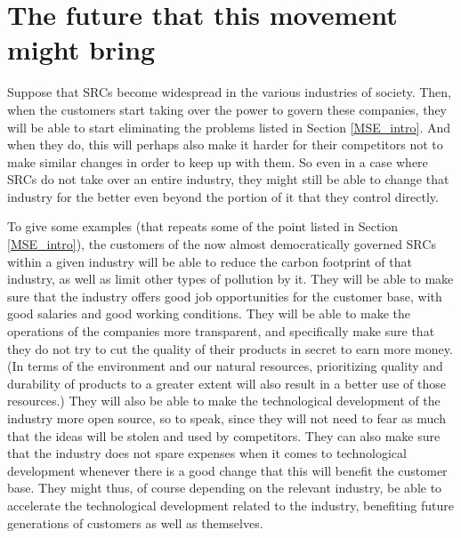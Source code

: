 \documentclass{article}
\begin{document}
\section{The future that this movement might bring}


Suppose that SRCs become widespread in the various industries of society. Then, when the customers start taking over the power to govern these companies, they will be able to start eliminating the problems listed in Section \ref{MSE_intro}. And when they do, this will perhaps also make it harder for their competitors not to make similar changes in order to keep up with them. So even in a case where SRCs do not take over an entire industry, they might still be able to change that industry for the better even beyond the portion of it that they control directly. 



To give some examples (that repeats some of the point listed in Section \ref{MSE_intro}), the customers of the now almost democratically governed SRCs within a given industry will be able to reduce the carbon footprint of that industry, as well as limit other types of pollution by it. 
They will be able to make sure that the industry offers good job opportunities for the customer base, with good salaries and good working conditions. 
They will be able to make the operations of the companies more transparent, and specifically make sure that they do not try to cut the quality of their products in secret to earn more money. (In terms of the environment and our natural resources, prioritizing quality and durability of products to a greater extent will also result in a better use of those resources.) They will also be able to make the technological development of the industry more open source, so to speak, since they will not need to fear as much that the ideas will be stolen and used by competitors. They can also make sure that the industry does not spare expenses when it comes to technological development whenever there is a good change that this will benefit the customer base. They might thus, of course depending on the relevant industry, be able to accelerate the technological development related to the industry, benefiting future generations of customers as well as themselves.
\end{document}
